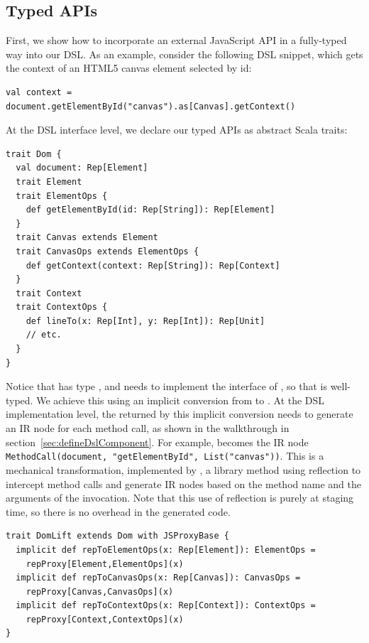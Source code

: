 \documentclass[runningheads,a4paper]{llncs}
\begin{document}
\subsection{Typed APIs}\label{sec:typedApis}
First, we show how to incorporate an external JavaScript API in a
fully-typed way into our DSL. As an example, consider the following
DSL snippet, which gets the context of an HTML5 canvas element
selected by id:
\begin{lstlisting}
val context = document.getElementById("canvas").as[Canvas].getContext()
\end{lstlisting}

At the DSL interface level, we declare our typed APIs as abstract
Scala traits:
\begin{lstlisting}
trait Dom {
  val document: Rep[Element]
  trait Element
  trait ElementOps {
    def getElementById(id: Rep[String]): Rep[Element]
  }
  trait Canvas extends Element
  trait CanvasOps extends ElementOps {
    def getContext(context: Rep[String]): Rep[Context]
  }
  trait Context
  trait ContextOps {
    def lineTo(x: Rep[Int], y: Rep[Int]): Rep[Unit]
    // etc.
  }
}
\end{lstlisting}

Notice that  has type , and needs to
implement the interface of , so that
 is well-typed. We achieve
this using an implicit conversion from  to
.  At the DSL implementation level, the 
returned by this implicit conversion needs to generate an IR node for
each method call, as shown in the walkthrough
in section~\ref{sec:defineDslComponent}. For example,
 becomes the IR node {\tt\small
  MethodCall(document, "getElementById", List("canvas"))}. This is a
mechanical transformation, implemented by , a library method using
reflection to intercept method calls and generate IR nodes based on
the method name and the arguments of the invocation. Note that this
use of reflection is purely at staging time, so there is no overhead
in the generated code.
\begin{lstlisting}
trait DomLift extends Dom with JSProxyBase {
  implicit def repToElementOps(x: Rep[Element]): ElementOps =
    repProxy[Element,ElementOps](x)
  implicit def repToCanvasOps(x: Rep[Canvas]): CanvasOps =
    repProxy[Canvas,CanvasOps](x)
  implicit def repToContextOps(x: Rep[Context]): ContextOps =
    repProxy[Context,ContextOps](x)
}
\end{lstlisting}
\end{document}
